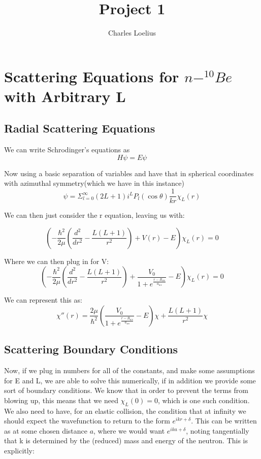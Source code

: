 \documentclass[11pt]{article} %
\title{Project 1}
\author{Charles Loelius}
\begin{document}
\maketitle

\section{Scattering Equations for  $n-^{10}Be $ with Arbitrary L}
\subsection{Radial Scattering Equations}
We can write Schrodinger's equations as 
\begin{equation}
H\psi=E\psi
\end{equation}

Now using a basic separation of variables and have that in spherical coordinates with azimuthal symmetry(which we have in this instance)\\

\begin{equation}
\psi=\Sigma_{l=0}^\infty (2L+1)i^LP_l(\cos\theta)\frac{1}{kr}\chi_L(r)
\end{equation}

We can then just consider the r equation, leaving us with:

\begin{equation}
(-\frac{\hbar^2}{2\mu}(\frac{d^2}{dr^2}-\frac{L(L+1)}{r^2})+V(r)-E)\chi_L(r)=0
\end{equation}

Where we can then plug in for V:\\
\begin{equation}
(-\frac{\hbar^2}{2\mu}(\frac{d^2}{dr^2}-\frac{L(L+1)}{r^2})+\frac{V_0}{1+e^{\frac{r-R_{ws}}{a_{ws}}}}-E)\chi_L(r)=0
\end{equation}

We can represent this as:\\

\begin{equation}
\boxed{\chi''(r)=\frac{2\mu}{\hbar^2}(\frac{V_0}{1+e^{\frac{r-R_{ws}}{a_{ws}}}}-E)\chi+\frac{L(L+1)}{r^2}\chi}
\end{equation}
\subsection{Scattering Boundary Conditions}
Now, if we plug in numbers for all of the constants, and make some assumptions for E and L, we are able to solve this numerically, if in addition we provide some sort of boundary conditions. We know that in order to prevent the terms from blowing up, this means that we need $\chi_L(0)=0$, which is one such condition. We also need to have, for an elastic collision, the condition that at infinity we should expect the wavefunction to return to the form $e^{ikr+\delta}$. This can be written as at some chosen distance $a$, where we would want $e^{ika+\delta}$, noting tangentially that k is determined by the (reduced) mass and energy of the neutron. This is explicitly:\\
\end{document}
